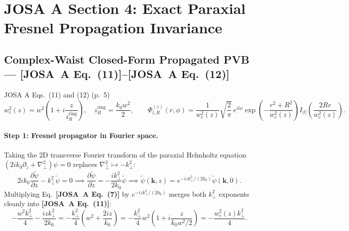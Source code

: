 \documentclass[10pt,letterpaper]{article}
\newcommand{\abs}[1]{\lvert #1 \rvert}
\newcommand{\josa}[1]{\textbf{[JOSA~A Eq.~(#1)]}}
\numberwithin{equation}{section}
\begin{document}
\section{JOSA A Section 4: Exact Paraxial Fresnel Propagation Invariance}
\label{sec:s4}

\subsection{Complex-Waist Closed-Form Propagated PVB --- \josa{11}--\josa{12}}
\label{sec:s4_fresnel}

\begin{targeteq}{JOSA A Eqs.~(11) and (12) (p.~5)}
\[
  w_c^2(z) = w^2\!\left(1 + i\frac{z}{z_R^{\mathrm{ring}}}\right), \quad z_R^{\mathrm{ring}} = \frac{k_0 w^2}{2}, \qquad
  \Phi_{l,R}^{(z)}(r,\phi) = \frac{1}{w_c^2(z)}\sqrt{\frac{2}{\pi}}\,e^{il\phi}\exp\!\left(-\frac{r^2+R^2}{w_c^2(z)}\right) I_{\abs{l}}\!\left(\frac{2Rr}{w_c^2(z)}\right).
\]
\end{targeteq}

\paragraph*{Step 1: Fresnel propagator in Fourier space.}
Taking the 2D transverse Fourier transform of the paraxial Helmholtz equation $(2ik_0\partial_z + \nabla_\perp^2)\psi = 0$ replaces $\nabla_\perp^2 \mapsto -k_\perp^2$:
\begin{equation}
  2ik_0\frac{\partial\widetilde{\psi}}{\partial z} - k_\perp^2\widetilde{\psi} = 0 \implies \frac{\partial\widetilde{\psi}}{\partial z} = -\frac{i k_\perp^2}{2k_0}\widetilde{\psi} \implies \widetilde{\psi}(\mathbf{k}, z) = e^{-iz k_\perp^2/(2k_0)}\widetilde{\psi}(\mathbf{k}, 0).
\end{equation}
Multiplying Eq.~\josa{7} by $e^{-iz k_\perp^2/(2k_0)}$ merges both $k_\perp^2$ exponents cleanly into \josa{11}:
\begin{equation}
  -\frac{w^2 k_\perp^2}{4} - \frac{i z k_\perp^2}{2k_0} = -\frac{k_\perp^2}{4}\left(w^2 + \frac{2iz}{k_0}\right) = -\frac{k_\perp^2}{4} w^2\!\left(1 + i\frac{z}{k_0 w^2/2}\right) = -\frac{w_c^2(z) k_\perp^2}{4}.
\end{equation}
\end{document}
